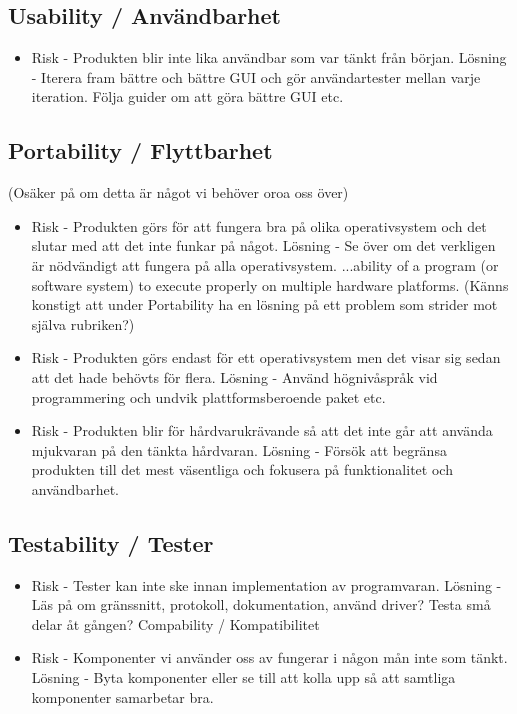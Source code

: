 \subsection{Usability / Användbarhet}
\begin{itemize}
\item Risk - Produkten blir inte lika användbar som var tänkt från början.
Lösning - Iterera fram bättre och bättre GUI och gör användartester mellan varje iteration. Följa guider om att göra bättre GUI etc.
\end{itemize}

\subsection{Portability / Flyttbarhet}
(Osäker på om detta är något vi behöver oroa oss över)
\begin{itemize}
\item Risk - Produkten görs för att fungera bra på olika operativsystem och det slutar med att det inte funkar på något.
Lösning - Se över om det verkligen är nödvändigt att fungera på alla operativsystem.
...ability of a program (or software system) to execute properly on multiple hardware platforms.
(Känns konstigt att under Portability ha en lösning på ett problem som strider mot själva rubriken?)
\item Risk - Produkten görs endast för ett operativsystem men det visar sig sedan att det hade behövts för flera.
Lösning - Använd högnivåspråk vid programmering och undvik plattformsberoende paket etc.
\item Risk - Produkten blir för hårdvarukrävande så att det inte går att använda mjukvaran på den tänkta hårdvaran.
Lösning - Försök att begränsa produkten till det mest väsentliga och fokusera på funktionalitet och användbarhet.
\end{itemize}

\subsection{Testability / Tester}
\begin{itemize}
\item Risk - Tester kan inte ske innan implementation av programvaran.
Lösning - Läs på om gränssnitt, protokoll, dokumentation, använd driver? Testa små delar åt gången?
Compability / Kompatibilitet

\item Risk - Komponenter vi använder oss av fungerar i någon mån inte som tänkt.
Lösning - Byta komponenter eller se till att kolla upp så att samtliga komponenter samarbetar bra.
\end{itemize}


